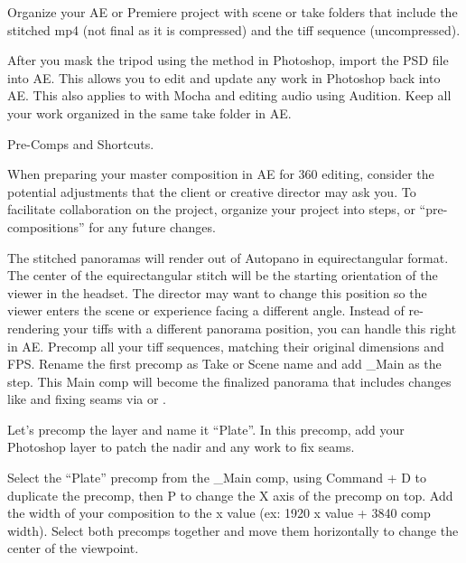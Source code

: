 \begin{fullwidth}
\clearpage
Organize your AE or Premiere project with scene or take folders that include the stitched mp4 (not final as it is compressed) and the tiff sequence (uncompressed). 


After you mask the tripod using the \textbf{} method in Photoshop, import the PSD file into AE. This allows you to edit and update any work in Photoshop back into AE. This also applies to \textbf{} with Mocha and editing audio using Audition. Keep all your work organized in the same take folder in AE.

\clearpage
{\large Pre-Comps and Shortcuts. \par}

When preparing your master composition in AE for 360 editing, consider the potential adjustments that the client or creative director may ask you. To facilitate collaboration on the project, organize your project into steps, or “pre-compositions” for any future changes. 

The stitched panoramas will render out of Autopano in equirectangular format. The center of the equirectangular stitch will be the starting orientation of the viewer in the headset. The director may want to change this position so the viewer enters the scene or experience facing a different angle. Instead of re-rendering your tiffs with a different panorama position, you can handle this right in AE. Precomp all your tiff sequences, matching their original dimensions and FPS. Rename the first precomp as Take or Scene name and add \_Main as the step. This Main comp will become the finalized panorama that includes changes like \textbf{} and fixing seams via \textbf{} or \textbf{}. 

\clearpage
Let’s precomp the layer and name it “Plate”. In this precomp, add your Photoshop layer to patch the nadir and any work to fix seams. 



Select the “Plate” precomp from the \_Main comp, using Command + D to duplicate the precomp, then P to change the X axis of the precomp on top. Add the width of your composition to the x value (ex: 1920 x value + 3840 comp width). Select both precomps together and move them horizontally to change the center of the viewpoint.
\clearpage
{}


\end{fullwidth}
